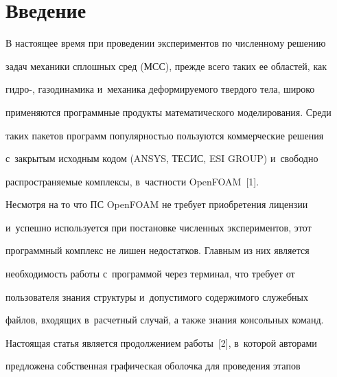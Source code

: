       \thispagestyle{headings}


      




     


     \vspace*{-12pt}





\section{Введение}





  В настоящее время при проведении экспериментов по численному решению 


задач механики сплошных сред (МСС), прежде всего таких ее областей, как 


гид\-ро-, газодинамика и~механика деформируемого твердого тела, широко 


применяются программные продукты математического моделирования. Среди 


таких пакетов программ популярностью пользуются коммерческие решения 


с~закрытым исходным кодом (ANSYS, ТЕСИС, ESI GROUP) и~свободно 


распространяемые комплексы, в~частности OpenFOAM~[1]. 


  


  Несмотря на то что ПС OpenFOAM не требует приобретения лицензии 


  и~успешно используется при постановке численных экспериментов, этот 


программный комплекс не лишен недостатков. Главным из них является 


необходимость работы с~программой через терминал, что требует от 


пользователя знания структуры и~допустимого содержимого служебных 


файлов, входящих в~расчетный случай, а также знания консольных команд. 


  


  Настоящая статья является продолжением работы~[2], в~которой авторами 


предложена собственная графическая оболочка для проведения этапов 


